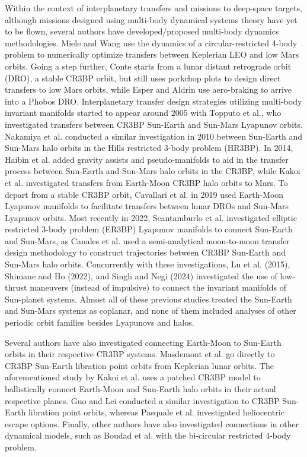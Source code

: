Within the context of interplanetary transfers and missions to deep-space targets, although
missions designed using multi-body dynamical systems theory have yet to be flown, several authors
have developed/proposed multi-body dynamics methodologies. Miele and Wang use the dynamics of a
circular-restricted 4-body problem to numerically optimize transfers between Keplerian LEO and low
Mars orbits\cite{Miele:1999}. Going a step further, Conte starts from a lunar distant retrograde
orbit (DRO), a stable CR3BP orbit, but still uses porkchop plots to design direct transfers to low
Mars orbits\cite{Conte:2017}, while Esper and Aldrin use aero-braking to arrive into a Phobos
DRO\cite{Esper:2019}.
Interplanetary transfer design strategies utilizing multi-body invariant manifolds started to
appear around 2005 with Topputo et al., who investigated transfers between CR3BP Sun-Earth and
Sun-Mars Lyapunov orbits\cite{Topputo:2005}. Nakamiya et al. conducted a similar investigation in
2010 between Sun-Earth and Sun-Mars halo orbits in the Hills restricted 3-body problem
(HR3BP)\cite{Nakamiya:2010}. In 2014, Haibin et al. added gravity assists and pseudo-manifolds to
aid in the transfer process between Sun-Earth and Sun-Mars halo orbits in the
CR3BP\cite{Haibin:2014}, while Kakoi et al. investigated transfers from Earth-Moon CR3BP halo
orbits to Mars\cite{Kakoi:2014}. To depart from a stable CR3BP orbit, Cavallari et al. in 2019 used
Earth-Moon Lyapunov manifolds to facilitate transfers between lunar DROs and Sun-Mars Lyapunov
orbits\cite{Cavallari:2019}. Most recently in 2022, Scantamburlo et al. investigated elliptic
restricted 3-body problem (ER3BP) Lyapunov manifolds to connect Sun-Earth and
Sun-Mars\cite{Scantamburlo:2022}, as Canales et al. used a semi-analytical moon-to-moon transfer
design methodology to construct trajectories between CR3BP Sun-Earth and Sun-Mars halo
orbits\cite{Canales:2021a,Canales:2022}. Concurrently with these investigations, Lu et al. (2015)\cite{Lu:2015},
Shimane and Ho (2022)\cite{Shimane:2022}, and Singh and Negi (2024)\cite{Singh:2024} investigated
the use of low-thrust maneuvers (instead of impulsive) to connect the invariant manifolds of
Sun-planet systems\cite{Lu:2015,Shimane:2022}. Almost all of these previous studies treated the
Sun-Earth and Sun-Mars systems as coplanar, and none of them included analyses of other periodic
orbit families besides Lyapunovs and halos.

Several authors have also investigated connecting Earth-Moon to Sun-Earth orbits in their
respective CR3BP systems. Masdemont et al. go directly to CR3BP Sun-Earth libration point orbits
from Keplerian lunar orbits\cite{Masdemont:2021}. The aforementioned study by Kakoi et al.
uses a patched CR3BP model to ballistically connect Earth-Moon and Sun-Earth halo orbits in their
actual respective planes\cite{Kakoi:2014}. Guo and Lei conducted a similar investigation
to CR3BP Sun-Earth libration point orbits\cite{Guo:2019}, whereas Pasquale et al. investigated
heliocentric escape options\cite{Pasquale:2021}. Finally, other authors have also
investigated connections in other dynamical models, such as Boudad et al. with the bi-circular
restricted 4-body problem\cite{Boudad:2021}.


